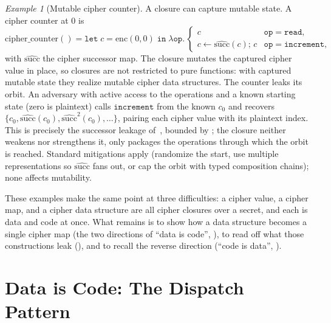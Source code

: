 \documentclass[11pt]{article}
\theoremstyle{definition}
\theoremstyle{plain}
\theoremstyle{definition}
\theoremstyle{remark}
\newtheorem{example}{Example}[section]
\newcommand{\enc}{\mathrm{enc}}
\begin{document}
\begin{example}[Mutable cipher counter]
\label{ex:cipher-counter}
A closure can capture mutable state. A cipher counter at $0$ is
\[
\mathrm{cipher\_counter}() = \texttt{let}\; c = \enc(0, 0)\;
\texttt{in}\; \lambda \texttt{op}.\,
\begin{cases}
c & \texttt{op} = \texttt{read},\\
c \leftarrow \widehat{\mathrm{succ}}(c);\, c & \texttt{op} = \texttt{increment},
\end{cases}
\]
with $\widehat{\mathrm{succ}}$ the cipher successor map. The closure
mutates the captured cipher value in place, so closures are not
restricted to pure functions: with captured mutable state they realize
mutable cipher data structures. The counter leaks its orbit. An
adversary with active access to the operations and a known starting
state (zero is plaintext) calls $\texttt{increment}$ from the known
$c_0$ and recovers $\{c_0, \widehat{\mathrm{succ}}(c_0),
\widehat{\mathrm{succ}}^2(c_0), \ldots\}$, pairing each cipher value
with its plaintext index. This is precisely the successor leakage
of~\cite[Ex.~5.2]{towell2026algebraic}, bounded by
; the closure neither weakens nor strengthens
it, only packages the operations through which the orbit is reached.
Standard mitigations apply (randomize the start, use multiple
representations so $\widehat{\mathrm{succ}}$ fans out, or cap the orbit
with typed composition chains); none affects mutability.
\end{example}

These examples make the same point at three difficulties: a cipher
value, a cipher map, and a cipher data structure are all cipher
closures over a secret, and each is data and code at once. What
remains is to show how a data structure becomes a single cipher map
(the two directions of \enquote{data is code},
), to read off what those
constructions leak (), and to recall the reverse
direction (\enquote{code is data}, ).

\section{Data is Code: The Dispatch Pattern}
\label{sec:dispatch}
\end{document}

